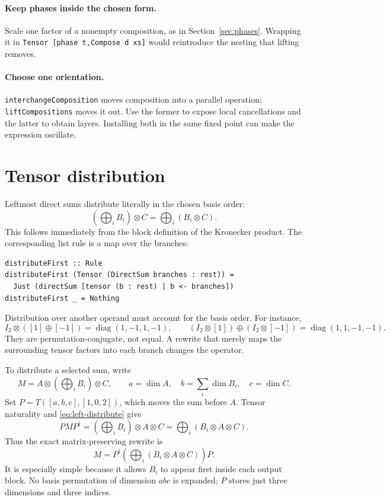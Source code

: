 \documentclass[11pt,a4paper]{article}
\newcommand{\code}[1]{\texttt{#1}}
\DeclareMathOperator{\diag}{diag}
\begin{document}
\paragraph{Keep phases inside the chosen form.}
Scale one factor of a nonempty composition, as in
Section~\ref{sec:phases}. Wrapping it in
\code{Tensor [phase t,Compose d xs]} would reintroduce the nesting
that lifting removes.

\paragraph{Choose one orientation.}
\code{interchangeComposition} moves composition into a parallel
operation; \code{liftCompositions} moves it out. Use the former to
expose local cancellations and the latter to obtain layers. Installing
both in the same fixed point can make the expression oscillate.

\section{Tensor distribution}

\label{sec:distribution}

Leftmost direct sums distribute literally in the chosen basis order:
\begin{equation}
 \left(\bigoplus_i B_i\right)\otimes C
   =\bigoplus_i(B_i\otimes C). \label{eq:left-distribute}
\end{equation}
This follows immediately from the block definition of the Kronecker
product. The corresponding list rule is a map over the branches:

\begin{lstlisting}
distributeFirst :: Rule
distributeFirst (Tensor (DirectSum branches : rest)) =
  Just (directSum [tensor (b : rest) | b <- branches])
distributeFirst _ = Nothing
\end{lstlisting}

Distribution over another operand must account for the basis order.
For instance,
\[
 I_2\otimes([1]\oplus[-1])=\diag(1,-1,1,-1),\qquad
 (I_2\otimes[1])\oplus(I_2\otimes[-1])=\diag(1,1,-1,-1).
\]
They are permutation-conjugate, not equal. A rewrite that merely maps
the surrounding tensor factors into each branch changes the operator.

To distribute a selected sum, write
\[
 M=A\otimes\left(\bigoplus_i B_i\right)\otimes C,
 \qquad a=\dim A,\quad b=\sum_i\dim B_i,\quad c=\dim C.
\]
Set $P=T([a,b,c],[1,0,2])$, which moves the sum before $A$.
Tensor naturality and \eqref{eq:left-distribute} give
\[
 PMP^\dagger
  =\left(\bigoplus_i B_i\right)\otimes A\otimes C
  =\bigoplus_i(B_i\otimes A\otimes C).
\]
Thus the exact matrix-preserving rewrite is
\begin{equation}
 \boxed{\displaystyle
 M=P^\dagger\left(\bigoplus_i(B_i\otimes A\otimes C)\right)P.}
 \label{eq:distribute}
\end{equation}
It is especially simple because it allows $B_i$ to appear first inside
each output block. No basis permutation of dimension $abc$ is expanded;
$P$ stores just three dimensions and three indices.
\end{document}
